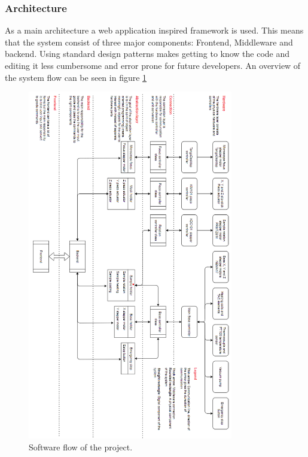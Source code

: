 \documentclass[10pt]{article}
\begin{document}
\subsubsection{Architecture}
As a main architecture a web application inspired framework is used. 
This means that the system consist of three major components: Frontend, Middleware and backend. 
Using standard design patterns makes getting to know the code and editing it less cumbersome and error prone for future developers.
An overview of the system flow can be seen in figure \ref{fig:software_architecture}

\begin{figure}[htp]
  \centering
  \includegraphics[width=0.8\textwidth]{img/design_cycle/code_flow.png}
  \caption{Software flow of the project.}
  \label{fig:software_architecture}
\end{figure}
\end{document}
